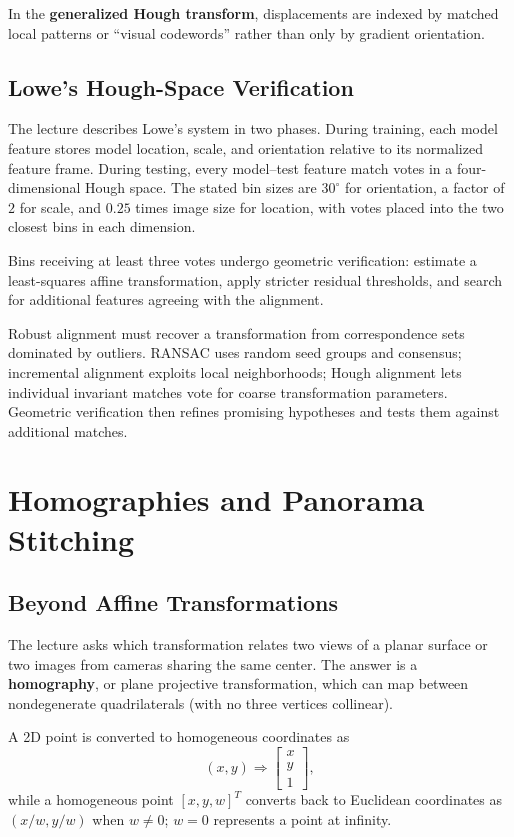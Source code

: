 \documentclass[11pt,a4paper,oneside]{report}
\begin{document}
In the \textbf{generalized Hough transform}, displacements are indexed by matched local patterns or ``visual codewords'' rather than only by gradient orientation.

\section{Lowe's Hough-Space Verification}

The lecture describes Lowe's system in two phases. During training, each model feature stores model location, scale, and orientation relative to its normalized feature frame. During testing, every model--test feature match votes in a four-dimensional Hough space. The stated bin sizes are $30^\circ$ for orientation, a factor of $2$ for scale, and $0.25$ times image size for location, with votes placed into the two closest bins in each dimension.

Bins receiving at least three votes undergo geometric verification: estimate a least-squares affine transformation, apply stricter residual thresholds, and search for additional features agreeing with the alignment.

\begin{chaptersummary}
Robust alignment must recover a transformation from correspondence sets dominated by outliers. RANSAC uses random seed groups and consensus; incremental alignment exploits local neighborhoods; Hough alignment lets individual invariant matches vote for coarse transformation parameters. Geometric verification then refines promising hypotheses and tests them against additional matches.
\end{chaptersummary}

\chapter{Homographies and Panorama Stitching}

\section{Beyond Affine Transformations}

The lecture asks which transformation relates two views of a planar surface or two images from cameras sharing the same center. The answer is a \textbf{homography}, or plane projective transformation, which can map between nondegenerate quadrilaterals (with no three vertices collinear).

A 2D point is converted to homogeneous coordinates as
\[
(x,y)\Rightarrow\begin{bmatrix}x\\y\\1\end{bmatrix},
\]
while a homogeneous point $[x,y,w]^T$ converts back to Euclidean coordinates as $(x/w,y/w)$ when $w\ne0$; $w=0$ represents a point at infinity.
\end{document}
